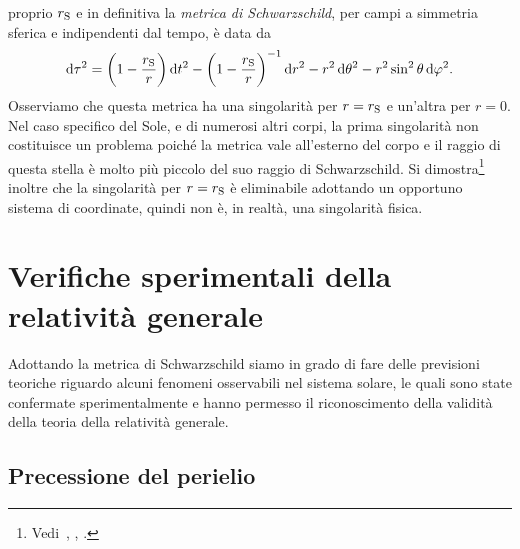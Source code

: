 proprio $r_{\textup{S}}$ e in definitiva la
\emph{metrica di Schwarzschild}, per campi a
simmetria sferica e indipendenti dal tempo, è data da
\begin{equation}
  \label{eq:metrica-schwarzschild}
  \mathop{}\!\mathrm{d}\tau^{2} = \bigg(1 - \frac{r_{\textup{S}}}{r} \bigg) \mathop{}\!\mathrm{d} t^{2} - \bigg(1 -
  \frac{r_{\textup{S}}}{r}\bigg)^{-1}\mathop{}\!\mathrm{d} r^{2} - r^{2}\mathop{}\!\mathrm{d}\theta^{2} -
  r^{2}\sin^{2}\theta \mathop{}\!\mathrm{d}\varphi^{2}.
\end{equation}
Osserviamo che questa metrica ha una singolarità per $r = r_{\textup{S}}$ e
un'altra per $r = 0$.  Nel caso specifico del Sole, e di numerosi altri corpi,
la prima singolarità non costituisce un problema poiché la metrica vale
all'esterno del corpo e il raggio di questa stella è molto più piccolo del suo
raggio di Schwarzschild.  Si
dimostra\footnote{Vedi~\textcite[511]{barone:relativita},
  \textcite[403-404]{landau:campi}, \textcite[207-208]{weinberg:gravitation}.}
inoltre che la singolarità per $r = r_{\textup{S}}$ è eliminabile adottando un
opportuno sistema di coordinate, quindi non è, in realtà, una singolarità
fisica.

\section{Verifiche sperimentali della relatività generale}
\label{sec:verififiche-relativita}

Adottando la metrica di Schwarzschild siamo in grado di fare delle previsioni
teoriche riguardo alcuni fenomeni osservabili nel sistema solare, le quali sono
state confermate sperimentalmente e hanno permesso il riconoscimento della
validità della teoria della relatività generale.

\subsection{Precessione del perielio}
\label{sec:precessione-perielio}

